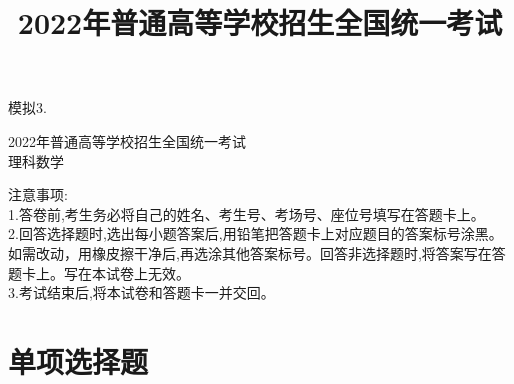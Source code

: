 \documentclass[11pt]{article}
\title{\heiti 2022年普通高等学校招生全国统一考试}
\begin{document}
	\heiti 模拟3.
	\begin{center}
		\songti \huge 2022年普通高等学校招生全国统一考试
		\\
		\heiti \Huge 理科数学
	\end{center}
	\heiti 注意事项:
	\\ \songti 1.答卷前,考生务必将自己的姓名、考生号、考场号、座位号填写在答题卡上。
	\\ 2.回答选择题时,选出每小题答案后,用铅笔把答题卡上对应题目的答案标号涂黑。如需改动，用橡皮擦干净后,再选涂其他答案标号。回答非选择题时,将答案写在答题卡上。写在本试卷上无效。
	\\ 3.考试结束后,将本试卷和答题卡一并交回。
	
\section{\heiti 单项选择题}
\end{document}
